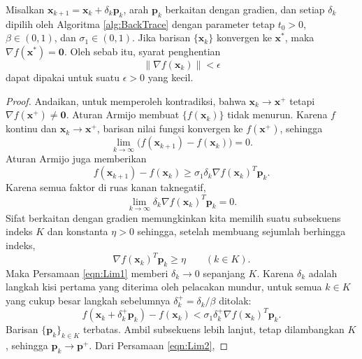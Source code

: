 \begin{theorem}
\label{thm:GenConverge}
Misalkan $\mathbf{x}_{k+1}=\mathbf{x}_k+\delta_k\mathbf{p}_k$, arah $\mathbf{p}_k$ berkaitan dengan gradien, dan setiap $\delta_k$ dipilih oleh Algoritma \ref{alg:BackTrace} dengan parameter tetap $t_0>0$, $\beta\in(0,1)$, dan $\sigma_1\in(0,1)$. Jika barisan $\{\mathbf{x}_k\}$ konvergen ke $\mathbf{x}^*$, maka $\nabla f(\mathbf{x}^*)=\mathbf{0}$. Oleh sebab itu, syarat penghentian
\begin{equation}
\lVert\nabla f(\mathbf{x}_k)\rVert<\epsilon
\end{equation}
dapat dipakai untuk suatu $\epsilon>0$ yang kecil.
\end{theorem}
\begin{proof}
Andaikan, untuk memperoleh kontradiksi, bahwa $\mathbf{x}_k\to\mathbf{x}^+$ tetapi $\nabla f(\mathbf{x}^+)\neq\mathbf{0}$. Aturan Armijo membuat $\{f(\mathbf{x}_k)\}$ tidak menurun. Karena $f$ kontinu dan $\mathbf{x}_k\to\mathbf{x}^+$, barisan nilai fungsi konvergen ke $f(\mathbf{x}^+)$, sehingga
\begin{equation}
\lim_{k\to\infty}\bigl(f(\mathbf{x}_{k+1})-f(\mathbf{x}_k)\bigr)=0.
\end{equation}
Aturan Armijo juga memberikan
\begin{equation}
f(\mathbf{x}_{k+1})-f(\mathbf{x}_k)
\geq\sigma_1\delta_k\nabla f(\mathbf{x}_k)^T\mathbf{p}_k.
\end{equation}
Karena semua faktor di ruas kanan taknegatif,
\begin{equation}
\lim_{k\to\infty}\delta_k\nabla f(\mathbf{x}_k)^T\mathbf{p}_k=0.
\label{eqn:Lim1}
\end{equation}
Sifat berkaitan dengan gradien memungkinkan kita memilih suatu subsekuens indeks $K$ dan konstanta $\eta>0$ sehingga, setelah membuang sejumlah berhingga indeks,
\begin{equation}
\nabla f(\mathbf{x}_k)^T\mathbf{p}_k\geq\eta
\qquad(k\in K).
\end{equation}
Maka Persamaan \ref{eqn:Lim1} memberi $\delta_k\to0$ sepanjang $K$. Karena $\delta_k$ adalah langkah kisi pertama yang diterima oleh pelacakan mundur, untuk semua $k\in K$ yang cukup besar langkah sebelumnya $\delta_k^+=\delta_k/\beta$ ditolak:
\begin{equation}
f(\mathbf{x}_k+\delta_k^+\mathbf{p}_k)-f(\mathbf{x}_k)
<\sigma_1\delta_k^+\nabla f(\mathbf{x}_k)^T\mathbf{p}_k.
\label{eqn:Lim2}
\end{equation}
Barisan $\{\mathbf{p}_k\}_{k\in K}$ terbatas. Ambil subsekuens lebih lanjut, tetap dilambangkan $K$, sehingga $\mathbf{p}_k\to\mathbf{p}^+$. Dari Persamaan \ref{eqn:Lim2},

\end{proof}
